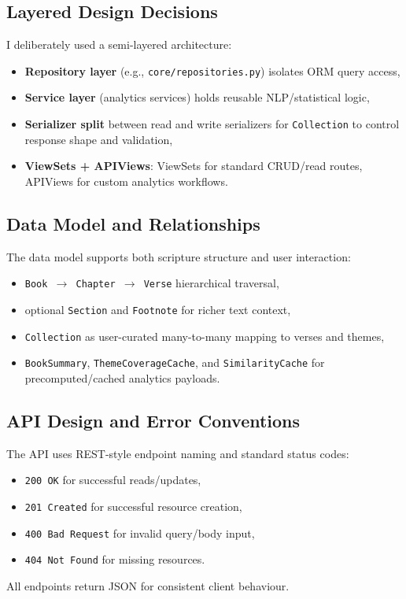 \documentclass[11pt,a4paper]{article}
\begin{document}
\subsection{Layered Design Decisions}
I deliberately used a semi-layered architecture:
\begin{itemize}[leftmargin=*]
	\item \textbf{Repository layer} (e.g., \texttt{core/repositories.py}) isolates ORM query access,
	\item \textbf{Service layer} (analytics services) holds reusable NLP/statistical logic,
	\item \textbf{Serializer split} between read and write serializers for \texttt{Collection} to control response shape and validation,
	\item \textbf{ViewSets + APIViews}: ViewSets for standard CRUD/read routes, APIViews for custom analytics workflows.
\end{itemize}

\subsection{Data Model and Relationships}
The data model supports both scripture structure and user interaction:
\begin{itemize}[leftmargin=*]
	\item \texttt{Book $\rightarrow$ Chapter $\rightarrow$ Verse} hierarchical traversal,
	\item optional \texttt{Section} and \texttt{Footnote} for richer text context,
	\item \texttt{Collection} as user-curated many-to-many mapping to verses and themes,
	\item \texttt{BookSummary}, \texttt{ThemeCoverageCache}, and \texttt{SimilarityCache} for precomputed/cached analytics payloads.
\end{itemize}

\subsection{API Design and Error Conventions}
The API uses REST-style endpoint naming and standard status codes:
\begin{itemize}[leftmargin=*]
	\item \texttt{200 OK} for successful reads/updates,
	\item \texttt{201 Created} for successful resource creation,
	\item \texttt{400 Bad Request} for invalid query/body input,
	\item \texttt{404 Not Found} for missing resources.
\end{itemize}
All endpoints return JSON for consistent client behaviour.
\end{document}
